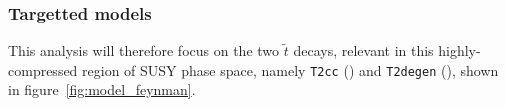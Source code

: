 



\subsubsection{Targetted models}
This analysis will therefore focus on the two $\tilde{t}$ decays, relevant in
this
highly-compressed region of SUSY phase space, namely \texttt{T2cc}
(\Ttwocc) and \texttt{T2degen} (\Ttwodegen), shown in
figure~\ref{fig:model_feynman}.

